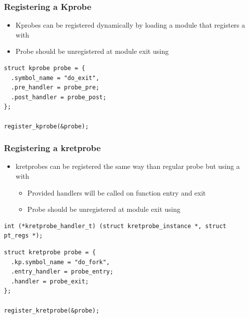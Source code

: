 \begin{frame}[fragile]
  \frametitle{Registering a Kprobe}
  \begin{itemize}
    \item Kprobes can be registered dynamically by loading a module that
          registers a  with 
    \item Probe should be unregistered at module exit using
  \end{itemize}

  \begin{block}{}
    \begin{verbatim}
struct kprobe probe = {
  .symbol_name = "do_exit",
  .pre_handler = probe_pre;
  .post_handler = probe_post;
};

register_kprobe(&probe);
    \end{verbatim}
  \end{block}
\end{frame}

\begin{frame}[fragile]
  \frametitle{Registering a kretprobe}
  \begin{itemize}
    \item kretprobes can be registered the same way than regular probe but using
          a  with 
    \begin{itemize}
      \item Provided handlers will be called on function entry and exit
      \item Probe should be unregistered at module exit using
    \end{itemize}
  \end{itemize}

  \begin{block}{}
    \begin{verbatim}
int (*kretprobe_handler_t) (struct kretprobe_instance *, struct pt_regs *);
    \end{verbatim}
  \end{block}

  \begin{block}{}
    \begin{verbatim}
struct kretprobe probe = {
  .kp.symbol_name = "do_fork",
  .entry_handler = probe_entry;
  .handler = probe_exit;
};

register_kretprobe(&probe);
    \end{verbatim}
  \end{block}
\end{frame}

